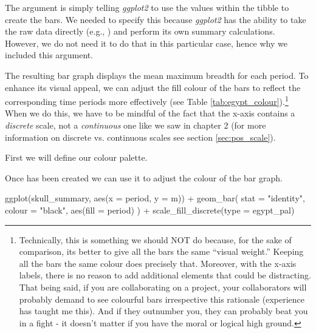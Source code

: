 The argument  is simply telling \textit{ggplot2} to use the values within the  tibble to create the bars.  We needed to specify this because \textit{ggplot2} has the ability to take the raw data directly (e.g., ) and perform its own summary calculations. However, we do not need it to do that in this particular case, hence why we included this argument.

The resulting bar graph displays the mean maximum breadth for each period. To enhance its visual appeal, we can adjust the fill colour of the bars to reflect the corresponding time periods more effectively (see Table \ref{tab:egypt_colour}).\footnote{Technically, this is something we should NOT do because, for the sake of comparison, its better to give all the bars the same ``visual weight.'' Keeping all the bars the same colour does precisely that. Moreover, with the x-axis labels, there is no reason to add additional elements that could be distracting. That being said, if you are collaborating on a project, your collaborators will probably demand to see colourful bars irrespective this rationale (experience has taught me this). And if they outnumber you, they can probably beat you in a fight - it doesn't matter if you have the moral or logical high ground.} When we do this, we have to be mindful of the fact that the x-axis contains a \textit{discrete} scale, not a \textit{continuous} one like we saw in chapter 2 (for more information on discrete vs. continuous scales see section \ref{sec:pos_scale}).



First we will define our colour palette.


\vspace{1em}

Once  has been created we can use it to adjust the colour of the bar graph.

\begin{inR}
ggplot(skull_summary, aes(x = period, y = m)) +
  geom_bar(
    stat = "identity",
    colour = "black",
    aes(fill = period)
  ) +
  scale_fill_discrete(type = egypt_pal)
\end{inR}

\vspace{2em}

